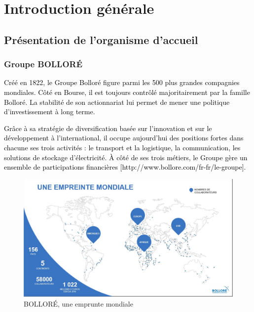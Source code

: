 \chapter{Introduction générale}
\vspace{-1cm}
\section{Présentation de l’organisme d’accueil }

\subsection{Groupe BOLLORÉ}
\textcolor{black}{
Créé en 1822, le Groupe Bolloré figure parmi les 500 plus grandes compagnies mondiales. }
\textcolor{black}{Côté en Bourse, il est toujours contrôlé majoritairement par la famille Bolloré. La stabilité de son actionnariat lui permet de mener une politique d'investissement à long terme.}

\textcolor{black}{Grâce à sa stratégie de diversification basée sur l'innovation et sur le développement à l'international, il occupe aujourd'hui des positions fortes dans chacune ses trois activités : le transport et la logistique, la communication, les solutions de stockage d'électricité.
À côté de ses trois métiers, le Groupe gère un ensemble de participations financières [http://www.bollore.com/fr-fr/le-groupe].}

\begin{figure}[H]
	\begin{center}
			\includegraphics[width=0.9\linewidth]{images_BOLLORE/emprunte}
	\end{center}
	\caption{BOLLORÉ, une emprunte mondiale}
	\label{fig:1}	
\end{figure}

